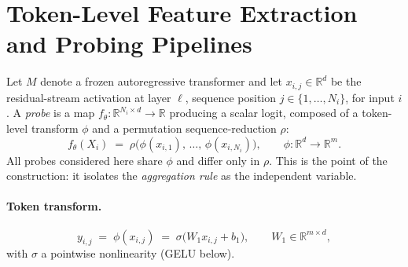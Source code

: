 %

\section{Token-Level Feature Extraction and Probing Pipelines}
\label{sec:pipeline}

Let $M$ denote a frozen autoregressive transformer and let $x_{i,j}\in\mathbb{R}^{d}$ be
the residual-stream activation at layer $\ell$, sequence position $j\in\{1,\dots,N_i\}$,
for input $i$. A \emph{probe} is a map $f_\theta:\mathbb{R}^{N_i\times d}\to\mathbb{R}$
producing a scalar logit, composed of a token-level transform $\phi$ and a permutation
sequence-reduction $\rho$:
%
\begin{equation}
  f_\theta(X_i)\;=\;\rho\!\big(\phi(x_{i,1}),\,\dots,\,\phi(x_{i,N_i})\big),
  \qquad
  \phi:\mathbb{R}^{d}\to\mathbb{R}^{m}.
  \label{eq:probe-general}
\end{equation}
%
All probes considered here share $\phi$ and differ only in $\rho$. This is the point of
the construction: it isolates the \emph{aggregation rule} as the independent variable.

\paragraph{Token transform.}
\begin{equation}
  y_{i,j} \;=\; \phi(x_{i,j}) \;=\; \sigma\!\big(W_1 x_{i,j} + b_1\big),
  \qquad W_1\in\mathbb{R}^{m\times d},
  \label{eq:mlp}
\end{equation}
with $\sigma$ a pointwise nonlinearity (GELU below).


